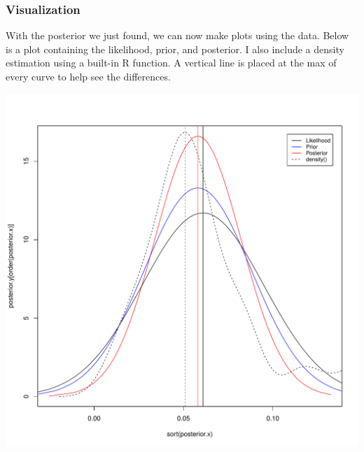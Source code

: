 \documentclass[10pt]{beamer}
\begin{document}
\begin{frame}
\frametitle{Visualization}
	With the posterior we just found, we can now make plots using the data. Below is a plot containing the likelihood, prior, and posterior. I also include a density estimation using a built-in R function. A vertical line is placed at the max of every curve to help see the differences.\vspace*{-5mm}
		\begin{center}
		\includegraphics[scale=0.25]{posteriors.pdf} 
		\end{center}
\end{frame}
\end{document}

